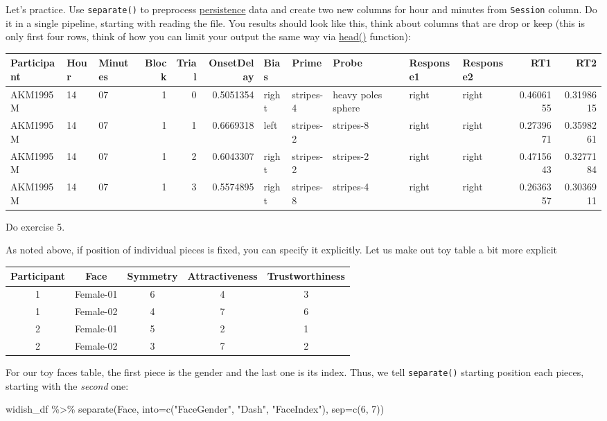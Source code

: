 \documentclass[
]{book}
\newenvironment{Shaded}{\begin{snugshade}}{\end{snugshade}}
\newcommand{\AttributeTok}[1]{\textcolor[rgb]{0.77,0.63,0.00}{#1}}
\newcommand{\DecValTok}[1]{\textcolor[rgb]{0.00,0.00,0.81}{#1}}
\newcommand{\FunctionTok}[1]{\textcolor[rgb]{0.00,0.00,0.00}{#1}}
\newcommand{\NormalTok}[1]{#1}
\newcommand{\SpecialCharTok}[1]{\textcolor[rgb]{0.00,0.00,0.00}{#1}}
\newcommand{\StringTok}[1]{\textcolor[rgb]{0.31,0.60,0.02}{#1}}
\begin{document}
Let's practice. Use \texttt{separate()} to preprocess \href{data/persistence.csv}{persistence} data and create two new columns for hour and minutes from \texttt{Session} column. Do it in a single pipeline, starting with reading the file. You results should look like this, think about columns that are drop or keep (this is only first four rows, think of how you can limit your output the same way via \href{https://stat.ethz.ch/R-manual/R-devel/library/utils/html/head.html}{head()} function):

\begin{tabular}{l|l|l|r|r|r|l|l|l|l|l|r|r}
\hline
Participant & Hour & Minutes & Block & Trial & OnsetDelay & Bias & Prime & Probe & Response1 & Response2 & RT1 & RT2\\
\hline
AKM1995M & 14 & 07 & 1 & 0 & 0.5051354 & right & stripes-4 & heavy poles sphere & right & right & 0.4606155 & 0.3198615\\
\hline
AKM1995M & 14 & 07 & 1 & 1 & 0.6669318 & left & stripes-2 & stripes-8 & right & right & 0.2739671 & 0.3598261\\
\hline
AKM1995M & 14 & 07 & 1 & 2 & 0.6043307 & right & stripes-2 & stripes-2 & right & right & 0.4715643 & 0.3277184\\
\hline
AKM1995M & 14 & 07 & 1 & 3 & 0.5574895 & right & stripes-8 & stripes-4 & right & right & 0.2636357 & 0.3036911\\
\hline
\end{tabular}

Do exercise 5.

As noted above, if position of individual pieces is fixed, you can specify it explicitly. Let us make out toy table a bit more explicit

\begin{tabular}{c|c|c|c|c}
\hline
Participant & Face & Symmetry & Attractiveness & Trustworthiness\\
\hline
1 & Female-01 & 6 & 4 & 3\\
\hline
1 & Female-02 & 4 & 7 & 6\\
\hline
2 & Female-01 & 5 & 2 & 1\\
\hline
2 & Female-02 & 3 & 7 & 2\\
\hline
\end{tabular}

For our toy faces table, the first piece is the gender and the last one is its index. Thus, we tell \texttt{separate()} starting position each pieces, starting with the \emph{second} one:

\begin{Shaded}
\begin{Highlighting}[]
\NormalTok{widish\_df }\SpecialCharTok{\%\textgreater{}\%}
  \FunctionTok{separate}\NormalTok{(Face, }\AttributeTok{into=}\FunctionTok{c}\NormalTok{(}\StringTok{"FaceGender"}\NormalTok{, }\StringTok{"Dash"}\NormalTok{, }\StringTok{"FaceIndex"}\NormalTok{), }\AttributeTok{sep=}\FunctionTok{c}\NormalTok{(}\DecValTok{6}\NormalTok{, }\DecValTok{7}\NormalTok{))}
\end{Highlighting}
\end{Shaded}
\end{document}
